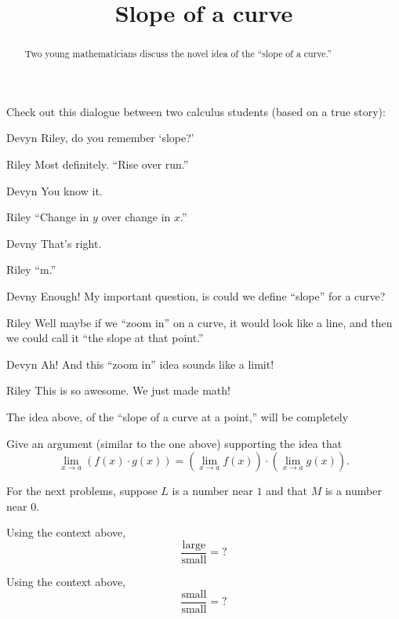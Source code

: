 \documentclass{ximera}
\title[Break-Ground:]{Slope of a curve}
\begin{document}
\begin{abstract}
Two young mathematicians discuss the novel idea of the ``slope of a curve.''
\end{abstract}
\maketitle


Check out this dialogue between two calculus students (based on a true
story):

\begin{dialogue}
\item[Devyn] Riley, do you remember `slope?'
\item[Riley] Most definitely. ``Rise over run.''
\item[Devyn] You know it.
\item[Riley] ``Change in $y$ over change in $x$.''
\item[Devny] That's right.  
\item[Riley] ``m.''
\item[Devny] Enough! My important question, is could we define
  ``slope'' for a curve?
\item[Riley] Well maybe if we ``zoom in'' on a curve, it would look
  like a line, and then we could call it ``the slope at that point.''
\item[Devyn] Ah! And this ``zoom in'' idea sounds like a limit!
\item[Riley] This is so awesome. We just made math!
\end{dialogue}

The idea above, of the ``slope of a curve at a point,'' will be completely 


\begin{problem}
  Give an argument (similar to the one above) supporting the idea that
  \[
  \lim_{x\to a}\left(f(x) \cdot g(x)\right) = \left(\lim_{x\to a} f(x) \right)\cdot\left(\lim_{x\to a} g(x)\right).
  \]
  \begin{freeResponse}
  \end{freeResponse}
\end{problem}


For the next problems, suppose $L$ is a number near $1$ and that $M$
is a number near $0$.


\begin{problem}

\end{problem}

\begin{problem}
  Using the context above, 
  \[
  \frac{\text{large}}{\text{small}} = ?
  \]
  \begin{multipleChoice}
  \end{multipleChoice}
\end{problem}

\begin{problem}
  Using the context above, 
  \[
  \frac{\text{small}}{\text{small}} = ?
  \]
  \begin{multipleChoice}
  \end{multipleChoice}
\end{problem}


\end{document}
